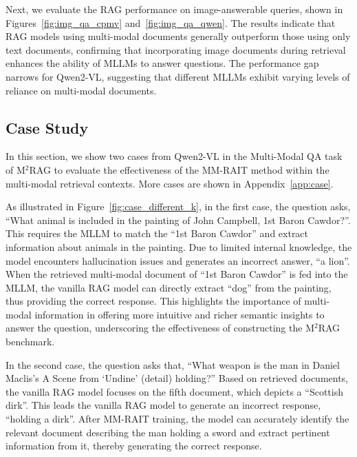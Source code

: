 Next, we evaluate the RAG performance on image-answerable queries, shown in Figures~\ref{fig:img_qa_cpmv} and~\ref{fig:img_qa_qwen}. The results indicate that RAG models using multi-modal documents generally outperform those using only text documents, confirming that incorporating image documents during retrieval enhances the ability of MLLMs to answer questions. The performance gap narrows for Qwen2-VL, suggesting that different MLLMs exhibit varying levels of reliance on multi-modal documents.


\subsection{Case Study}
In this section, we show two cases from Qwen2-VL in the Multi-Modal QA task of M$^2$RAG to evaluate the effectiveness of the MM-RAIT method within the multi-modal retrieval contexts. More cases are shown in Appendix~\ref{app:case}.

As illustrated in Figure~\ref{fig:case_different_k}, in the first case, the question asks, ``What animal is included in the painting of John Campbell, 1st Baron Cawdor?''. This requires the MLLM to match the ``1st Baron Cawdor'' and extract information about animals in the painting. Due to limited internal knowledge, the model encounters hallucination issues and generates an incorrect answer, ``a lion''. When the retrieved multi-modal document of ``1st Baron Cawdor'' is fed into the MLLM, the vanilla RAG model can directly extract ``dog'' from the painting, thus providing the correct response. This highlights the importance of multi-modal information in offering more intuitive and richer semantic insights to answer the question, underscoring the effectiveness of constructing the M$^2$RAG benchmark.

In the second case, the question asks that, ``What weapon is the man in Daniel Maclis's A Scene from `Undine' (detail) holding?'' Based on retrieved documents, the vanilla RAG model focuses on the fifth document, which depicts a ``Scottish dirk''. This leads the vanilla RAG model to generate an incorrect response, ``holding a dirk''. After MM-RAIT training, the model can accurately identify the relevant document describing the man holding a sword and extract pertinent information from it, thereby generating the correct response.

